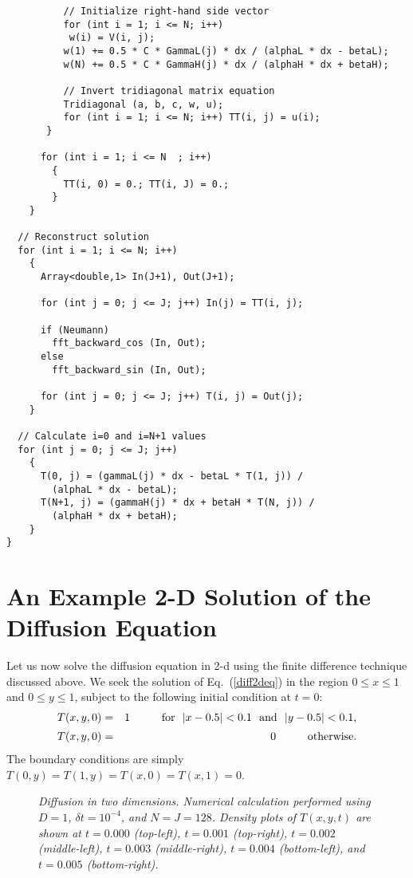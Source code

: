 {\begin{verbatim}
          // Initialize right-hand side vector
          for (int i = 1; i <= N; i++)
           w(i) = V(i, j);
          w(1) += 0.5 * C * GammaL(j) * dx / (alphaL * dx - betaL);
          w(N) += 0.5 * C * GammaH(j) * dx / (alphaH * dx + betaH);
	  
          // Invert tridiagonal matrix equation
          Tridiagonal (a, b, c, w, u);
          for (int i = 1; i <= N; i++) TT(i, j) = u(i);
       }
      
      for (int i = 1; i <= N  ; i++) 
        {
          TT(i, 0) = 0.; TT(i, J) = 0.;
        }
    }

  // Reconstruct solution
  for (int i = 1; i <= N; i++)
    {
      Array<double,1> In(J+1), Out(J+1);

      for (int j = 0; j <= J; j++) In(j) = TT(i, j);

      if (Neumann)
        fft_backward_cos (In, Out);
      else
        fft_backward_sin (In, Out);

      for (int j = 0; j <= J; j++) T(i, j) = Out(j);
    }

  // Calculate i=0 and i=N+1 values  
  for (int j = 0; j <= J; j++)
    {
      T(0, j) = (gammaL(j) * dx - betaL * T(1, j)) /
        (alphaL * dx - betaL);
      T(N+1, j) = (gammaH(j) * dx + betaH * T(N, j)) /
        (alphaH * dx + betaH);
    }
}
\end{verbatim}}

\section{An Example 2-D Solution of the Diffusion Equation}
Let us now solve the diffusion equation in 2-d using the finite difference technique discussed above.
We seek the solution of Eq.~(\ref{diff2deq}) in the region $0\leq x\leq 1$ and
$0\leq y\leq 1$, subject to the following initial condition at $t=0$:
\begin{eqnarray}
T(x,y,0) &=& 1\mbox{\hspace{1cm}for~~$|x-0.5|<0.1$~~and~~$|y-0.5|<0.1$,}\nonumber\\[0.5ex]
T(x,y,0) &=& 0\mbox{\hspace{1cm}otherwise.}
\end{eqnarray}
The boundary conditions are simply $T(0,y)=T(1,y)=T(x,0)=T(x,1)=0$. 

\begin{figure}
\epsfysize=5in
\centerline{}
\caption{\em Diffusion in two dimensions.
Numerical  calculation performed using
$D=1$, $\delta t = 10^{-4}$, and $N=J=128$. Density plots of $T(x,y,t)$ are shown at
$t=0.000$ (top-left), $t=0.001$ (top-right), $t=0.002$ (middle-left), $t=0.003$
(middle-right), $t=0.004$ (bottom-left), and $t=0.005$ (bottom-right). }
\label{diff2d6}
\end{figure}

